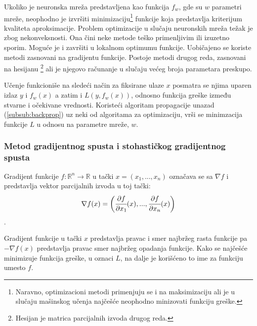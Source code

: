 Ukoliko je neuronska mreža predstavljena kao funkcija $f_w$, gde su $w$ parametri mreže, neophodno je izvršiti minimizaciju\footnote{Naravno, optimizacioni metodi primenjuju se i na maksimizaciju ali je u slučaju mašinskog učenja najčešće neophodno minizovati funkciju greške.} funkcije koja predstavlja kriterijum kvaliteta aproksimacije. Problem optimizacije u slučaju neuronskih mreža težak je zbog nekonveksnosti. Ona čini neke metode teško primenljivim ili izuzetno sporim. Moguće je i završiti u lokalnom optimumu funkcije. Uobičajeno se koriste metodi zasnovani na gradijentu funkcije. Postoje metodi drugog reda, zasnovani na hesijanu \footnote{Hesijan je matrica parcijalnih izvoda drugog reda.} ali je njegovo računanje u slučaju većeg broja parametara preskupo. \par
Učenje funkcioniše na sledeći način za fiksirane ulaze $x$ posmatra se njima uparen izlaz $y$ i $f_w(x)$ a zatim i $L(y, f_w(x))$, odnosno funkcija greške između stvarne i očekivane vrednosti. Koristeći algoritam propagacije unazad (\ref{subsub:backprop}) uz neki od algoritama za optimizaciju, vrši se minimzacija funkcije $L$ u odnosu na parametre mreže, $w$. 

\subsubsection{Metod gradijentnog spusta i stohastičkog gradijentnog spusta}

Gradijent funkcije $f:\mathbb{R}^n \rightarrow \mathbb{R}$ u tački $x=(x_1, ..., x_n)$ označava se sa $\nabla f$ i predstavlja vektor parcijalnih izvoda u toj tački:
\begin{equation}
\nabla f(x) = \bigg( \cfrac{\partial f}{\partial x_1}(x),...,\cfrac{\partial f}{\partial x_n}(x) \bigg)
\end{equation}.

Gradijent funkcije u tački $x$ predstavlja pravac i smer najbržeg rasta funkcije pa $- \nabla f(x)$ predstavlja pravac smer najbržeg opadanja funkcije. Kako se najčešće minimizuje funkcija greške, u oznaci $L$, na dalje je korišćeno to ime za funkciju umesto $f$.
\par


